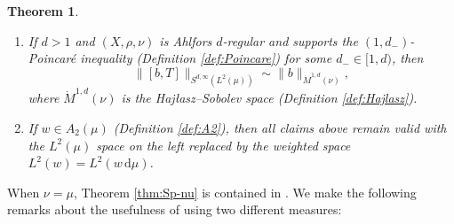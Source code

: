 \documentclass[reqno]{amsart}
\newcommand{\ud}[0]{\,\mathrm{d}}
\newcommand{\Norm}[2]{\|#1\|_{#2}}
\theoremstyle{plain}
\newtheorem{theorem}[equation]{Theorem}
\theoremstyle{definition}
\theoremstyle{remark}
\begin{document}
\begin{theorem}
\begin{enumerate}[\rm(1)]
  \item\label{it:p=d}
  If $d>1$ and $(X,\rho,\nu)$ is Ahlfors $d$-regular and supports the $(1,d_-)$-Poincar\'e inequality (Definition \ref{def:Poincare}) for some $d_-\in[1,d)$, then
\begin{equation*}
     \Norm{[b,T]}{S^{d,\infty}(L^2(\mu))}
    \sim\Norm{b}{\dot M^{1,d}(\nu)},
\end{equation*}
where $\dot M^{1,d}(\nu)$ is the Haj\l{}asz--Sobolev space (Definition \ref{def:Hajlasz}).

  \item\label{it:A2} If $w\in A_2(\mu)$ (Definition \ref{def:A2}), then all claims above remain valid with the $L^2(\mu)$  space on the left replaced by the weighted space $L^2(w)=L^2(w\ud\mu)$.
\end{enumerate}
\end{theorem}

When $\nu=\mu$, Theorem \ref{thm:Sp-nu} is contained in \cite[Theorem 1.1]{Hyt:Sp}. We make the following remarks about the usefulness of using two different measures:
\end{document}
